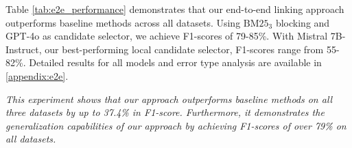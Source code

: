 Table \ref{tab:e2e_performance} demonstrates that our end-to-end linking approach outperforms baseline methods across all datasets. Using $\text{BM25}_3$ blocking and GPT-4o as candidate selector, we achieve F1-scores of 79-85\%. With Mistral 7B-Instruct, our best-performing local candidate selector, F1-scores range from 55-82\%. Detailed results for all models and error type analysis are available in \ref{appendix:e2e}.

\emph{This experiment shows that our approach outperforms baseline methods on all three datasets by up to 37.4\% in F1-score. Furthermore, it demonstrates the generalization capabilities of our approach by achieving F1-scores of over 79\% on all datasets.}